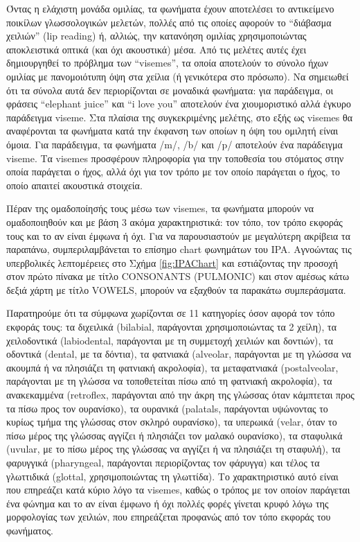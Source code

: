 Όντας η ελάχιστη μονάδα ομιλίας, τα φωνήματα έχουν αποτελέσει το αντικείμενο ποικίλων γλωσσολογικών μελετών, πολλές από τις οποίες αφορούν το ``διάβασμα χειλιών'' (lip reading) ή, αλλιώς, την κατανόηση ομιλίας χρησιμοποιώντας αποκλειστικά οπτικά (και όχι ακουστικά) μέσα. Από τις μελέτες αυτές έχει δημιουργηθεί το πρόβλημα των ``visemes'', τα οποία αποτελούν το σύνολο ήχων ομιλίας με πανομοιότυπη όψη στα χείλια (ή γενικότερα στο πρόσωπο). Να σημειωθεί ότι τα σύνολα αυτά δεν περιορίζονται σε μοναδικά φωνήματα: για παράδειγμα, οι φράσεις ``elephant juice'' και ``i love you'' αποτελούν ένα χιουμοριστικό αλλά έγκυρο παράδειγμα viseme. Στα πλαίσια της συγκεκριμένης μελέτης, στο εξής ως visemes θα αναφέρονται τα φωνήματα κατά την έκφανση των οποίων η όψη του ομιλητή είναι όμοια. Για παράδειγμα, τα φωνήματα /m/, /b/ και /p/ αποτελούν ένα παράδειγμα viseme. Τα visemes προσφέρουν πληροφορία για την τοποθεσία του στόματος στην οποία παράγεται ο ήχος, αλλά όχι για τον τρόπο με τον οποίο παράγεται ο ήχος, το οποίο απαιτεί ακουστικά στοιχεία.

Πέραν της ομαδοποίησής τους μέσω των visemes, τα φωνήματα μπορούν να ομαδοποιηθούν και με βάση 3 ακόμα χαρακτηριστικά: τον τόπο, τον τρόπο εκφοράς τους και το αν είναι έμφωνα ή όχι. Για να παρουσιαστούν με μεγαλύτερη ακρίβεια τα παραπάνω, συμπεριλαμβάνεται το επίσημο chart φωνημάτων του IPA. Αγνοώντας τις υπερβολικές λεπτομέρειες στο Σχήμα \ref{fig:IPAChart} και εστιάζοντας την προσοχή στον πρώτο πίνακα με τίτλο CONSONANTS (PULMONIC) και στον αμέσως κάτω δεξιά χάρτη με τίτλο VOWELS, μπορούν να εξαχθούν τα παρακάτω συμπεράσματα.

Παρατηρούμε ότι τα σύμφωνα χωρίζονται σε 11 κατηγορίες όσον αφορά τον τόπο εκφοράς τους: τα διχειλικά (bilabial, παράγονται χρησιμοποιώντας τα 2 χείλη), τα χειλοδοντικά (labiodental, παράγονται με τη συμμετοχή χειλιών και δοντιών), τα οδοντικά (dental, με τα δόντια), τα φατνιακά (alveolar, παράγονται με τη γλώσσα να ακουμπά ή να πλησιάζει τη φατνιακή ακρολοφία), τα μεταφατνιακά (postalveolar, παράγονται με τη γλώσσα να τοποθετείται πίσω από τη φατνιακή ακρολοφία), τα ανακεκαμμένα (retroflex, παράγονται από την άκρη της γλώσσας όταν κάμπτεται προς τα πίσω προς τον ουρανίσκο), τα ουρανικά (palatals, παράγονται υψώνοντας το κυρίως τμήμα της γλώσσας στον σκληρό ουρανίσκο), τα υπερωικά (velar, όταν το πίσω μέρος της γλώσσας αγγίζει ή πλησιάζει τον μαλακό ουρανίσκο), τα σταφυλικά (uvular, με το πίσω μέρος της γλώσσας να αγγίζει ή να πλησιάζει τη σταφυλή), τα φαρυγγικά (pharyngeal, παράγονται περιορίζοντας τον φάρυγγα) και τέλος τα γλωττιδικά (glottal, χρησιμοποιώντας τη γλωττίδα). Το χαρακτηριστικό αυτό είναι που επηρεάζει κατά κύριο λόγο τα visemes, καθώς ο τρόπος με τον οποίον παράγεται ένα φώνημα και το αν είναι έμφωνο ή όχι πολλές φορές γίνεται κρυφό λόγω της μορφολογίας των χειλιών, που επηρεάζεται προφανώς από τον τόπο εκφοράς του φωνήματος.


